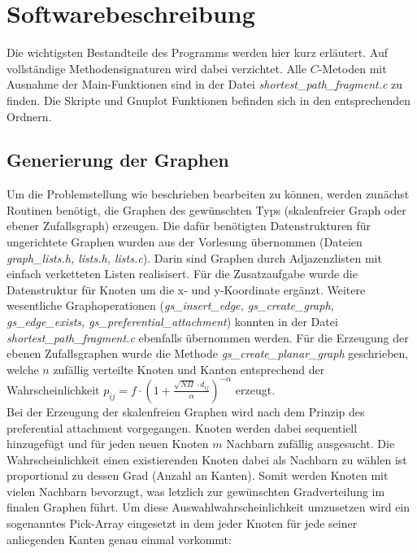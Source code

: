 \documentclass[10pt]{article}
\begin{document}
\section{Softwarebeschreibung}

Die wichtigsten Bestandteile des Programms werden hier kurz erläutert. Auf vollständige Methodensignaturen wird dabei verzichtet. Alle $C$-Metoden mit Ausnahme der Main-Funktionen sind in der Datei \textit{shortest\_path\_fragment.c} zu finden. Die Skripte und Gnuplot Funktionen befinden sich in den entsprechenden Ordnern.

\subsection{Generierung der Graphen}
Um die Problemstellung wie beschrieben bearbeiten zu können, werden zunächst Routinen benötigt, die Graphen des gewünschten Typs (skalenfreier Graph oder ebener Zufallsgraph) erzeugen. Die dafür benötigten Datenstrukturen für ungerichtete Graphen wurden aus der Vorlesung übernommen (Dateien \textit{graph\_lists.h, lists.h, lists.c}). Darin sind Graphen durch Adjazenzlisten mit einfach verketteten Listen realisisert. Für die Zusatzaufgabe wurde die Datenstruktur für Knoten um die x- und y-Koordinate ergänzt. Weitere wesentliche Graphoperationen (\textit{gs\_insert\_edge, gs\_create\_graph, gs\_edge\_exists, gs\_preferential\_attachment}) konnten in der Datei \textit{shortest\_path\_fragment.c} ebenfalls übernommen werden. Für die Erzeugung der ebenen Zufallsgraphen wurde die Methode \textit{gs\_create\_planar\_graph} geschrieben, welche $n$ zufällig verteilte Knoten und Kanten entsprechend der Wahrscheinlichkeit $p_{ij} = f \cdot (1 + \frac{\sqrt{N \Pi} \cdot d_{ij}}{\alpha})^{-\alpha}$ erzeugt.\\

Bei der Erzeugung der skalenfreien Graphen wird nach dem Prinzip des preferential attachment vorgegangen. Knoten werden dabei sequentiell hinzugefügt und für jeden neuen Knoten $m$ Nachbarn zufällig ausgesucht. Die Wahrscheinlichkeit einen existierenden Knoten dabei als Nachbarn zu wählen ist proportional zu dessen Grad (Anzahl an Kanten). Somit werden Knoten mit vielen Nachbarn bevorzugt, was letzlich zur gewünschten Gradverteilung im finalen Graphen führt. Um diese Auswahlwahrscheinlichkeit umzusetzen wird ein sogenanntes Pick-Array eingesetzt in dem jeder Knoten für jede seiner anliegenden Kanten genau einmal vorkommt: \\
\end{document}
